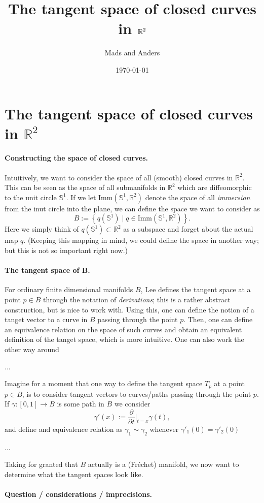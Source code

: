\documentclass[a4,danish]{article}
\title{The tangent space of closed curves in $\R^2$}
\author{Mads and Anders}
\date{\today}
\newcommand{\R}{\mathbb{R}}
\renewcommand{\S}{\mathbb{S}}
\begin{document}

\section*{The tangent space of closed curves in $\R^2$}
\label{sec:tangent-space-closed}


\paragraph{Constructing the space of closed curves.}
Intuitively, we want to consider the space of all (smooth) closed
curves in $\R^2$. This can be seen as the space of all submanifolds in
$\R^2$ which are diffeomorphic to the unit circle $\S^1$. If we let
$\text{Imm}(\S^1,\R^2)$ denote the space of all \textit{immersion}
from the inut circle into the plane, we can define the space we
want to consider as
\begin{equation*}
  B :=
  \left\{
    q(\S^1) \mid q \in \text{Imm}(\S^1,\R^2)
  \right\}.
\end{equation*}
Here we simply think of $q(\S^1) \subset \R^2$ as a subspace and forget
about the actual map $q$. (Keeping this mapping in mind, we could
define the space in another way; but this is not so important right
now.)

\paragraph{The tangent space of B.}
For ordinary finite dimensional manifolds $B$, Lee defines the tangent
space at a point $p \in B$ through the notation of
\textit{derivations}; this is a rather abstract construction, but is
nice to work with. Using this, one can define the notion of a
tanget vector to a curve in $B$ passing through the point $p$. Then,
one can define an equivalence relation on the space of such curves and
obtain an equivalent definition of the tanget space, which is more
intuitive. One can also work the other way around

...

Imagine for a moment that
one way to define the tangent space $T_p$ at a point $p \in B$, is to
consider tangent vectors to curves/paths passing through the point
$p$. If $\gamma \colon [0,1] \rightarrow B$ is some path in $B$ we
consider
\begin{equation*}
  \gamma'(x)
  := \frac{\partial }{\partial t} \bigg\rvert_{t=x} \gamma(t),
\end{equation*}
and define and equivalence relation as $\gamma_1 \sim \gamma_2$
whenever $\gamma'_1(0)=\gamma'_2(0)$

...

Taking for granted that $B$ actually is a (Fr\'echet) manifold, we now
want to determine what the tangent spaces look like.

\paragraph{Question / considerations / imprecisions.}
\end{document}
